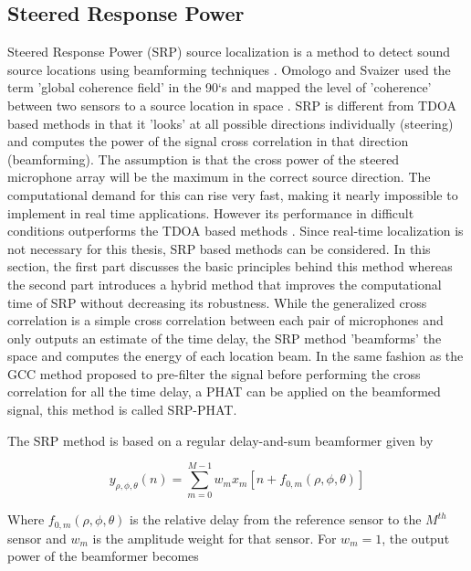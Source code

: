 \subsection{Steered Response Power}

Steered Response Power (SRP) source localization is a method to detect sound source locations using beamforming techniques \cite{krim1996two}. Omologo and Svaizer used the term 'global coherence field' in the 90`s and mapped the level of 'coherence' between two sensors to a source location in space \cite{omologo1994acoustic}. SRP is different from TDOA based methods in that it 'looks' at all possible directions individually (steering) and computes the power of the signal cross correlation in that direction (beamforming). The assumption is that the cross power of the steered microphone array will be the maximum in the correct source direction. The computational demand for this can rise very fast, making it nearly impossible to implement in real time applications. However its performance in difficult conditions outperforms the TDOA based methods \cite{dmochowski2007generalized}. Since real-time localization is not necessary for this thesis, SRP based methods can be considered. In this section, the first part discusses the basic principles behind this method whereas the second part introduces a hybrid method that improves the computational time of SRP without decreasing its robustness.  While the generalized cross correlation is a simple cross correlation between each pair of microphones and only outputs an estimate of the time delay, the SRP method 'beamforms' the space and computes the energy of each location beam. In the same fashion as the GCC method proposed to pre-filter the signal before performing the cross correlation for all the time delay, a PHAT can be applied on the beamformed signal, this method is called SRP-PHAT.


The SRP method is based on a regular delay-and-sum beamformer given by

\begin{equation}
    y_{\rho,\phi,\theta}(n)=\sum\limits_{m=0}^{M-1}{w_m x_m[n + f_{0,m}(\rho,\phi,\theta)]} 
\end{equation}

Where $f_{0,m}(\rho,\phi,\theta)$ is the relative delay from the reference sensor to the $M^{th}$ sensor and $w_m$ is the amplitude weight for that sensor. For $w_m=1$, the output power of the beamformer becomes


